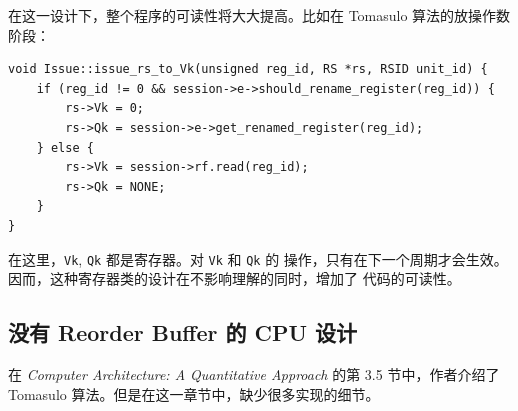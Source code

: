 \documentclass[12pt]{article}
\begin{document}
    在这一设计下，整个程序的可读性将大大提高。比如在 Tomasulo 算法的放操作数阶段：

    \begin{verbatim}
void Issue::issue_rs_to_Vk(unsigned reg_id, RS *rs, RSID unit_id) {
    if (reg_id != 0 && session->e->should_rename_register(reg_id)) {
        rs->Vk = 0;
        rs->Qk = session->e->get_renamed_register(reg_id);
    } else {
        rs->Vk = session->rf.read(reg_id);
        rs->Qk = NONE;
    }
}
    \end{verbatim}

    在这里，\texttt{Vk}, \texttt{Qk} 都是寄存器。对 \texttt{Vk} 和 \texttt{Qk} 的
    操作，只有在下一个周期才会生效。因而，这种寄存器类的设计在不影响理解的同时，增加了
    代码的可读性。

    \subsection{没有 Reorder Buffer 的 CPU 设计}

    在 \emph{Computer Architecture: A Quantitative Approach} 的第 3.5 节中，作者介绍了
    Tomasulo 算法。但是在这一章节中，缺少很多实现的细节。
\end{document}
